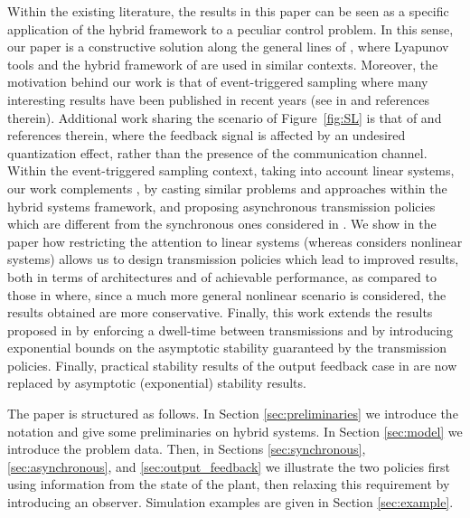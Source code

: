 \documentclass[twocolumn]{autart}
\begin{document}
Within the existing literature, the results in this
paper can be seen as a specific application of the hybrid
framework \cite{GoebelCSM09} to a peculiar control problem.
In this sense, our paper
is a constructive solution
along the general lines of \cite{Carnevale07,LpNCS,Postoyan11a},
where Lyapunov tools and the hybrid framework of
\cite{GoebelCSM09} are used { in similar 
contexts.
Moreover, the motivation behind our work is that
of event-triggered sampling where
many interesting results have been published in recent years (see
in \cite{Cervin08,Mazo08,Tabuada07,Wang08a} and 
references therein)}. {
Additional work sharing the scenario of Figure~\ref{fig:SL}
is that of \cite{SharonTAC12,NesicTAC09} and references therein, where 
the feedback signal is affected by an undesired quantization effect,
rather than the presence of the communication channel.
Within the event-triggered sampling context,}
taking into account linear 
systems, our work complements \cite{Tabuada07,Wang08a}, by
casting similar problems and approaches within the hybrid systems framework, and
proposing asynchronous transmission policies which are 
different from the synchronous ones considered in
\cite{Tabuada07,Wang08a}. 
{
We show in the paper how restricting the attention to
linear systems (whereas \cite{Tabuada07,Wang08a} considers nonlinear
systems) allows us to design transmission policies which lead to
improved results, both in terms of architectures and of 
achievable performance, as compared to those in  \cite{Tabuada07,Wang08a}
where, since a much more general nonlinear scenario is considered, the
results obtained are more conservative.
Finally,} this work extends the results
proposed in \cite{Forni10} by enforcing a dwell-time between
transmissions and by introducing exponential bounds on the
asymptotic stability guaranteed by the transmission policies.
Finally, practical stability results of the output feedback case
in \cite{Forni10} are now replaced by asymptotic (exponential) 
stability results.

The paper is structured as follows. 
In Section \ref{sec:preliminaries} we 
introduce the notation and give some preliminaries 
on hybrid systems. In Section \ref{sec:model}
we introduce the problem data. Then, in Sections 
\ref{sec:synchronous}, \ref{sec:asynchronous}, and
\ref{sec:output_feedback} we illustrate the two policies
first using information from the state of the plant, 
then relaxing this requirement by introducing an observer.
Simulation examples are given in Section \ref{sec:example}.
\end{document}
